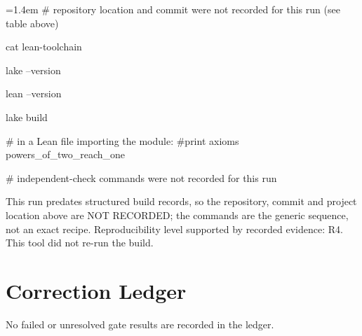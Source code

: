 \documentclass[11pt]{article}
\begin{document}
{\footnotesize\ttfamily\raggedright\hangindent=1.4em\noindent
\hspace*{0.00em}\# repository location and commit were not recorded for this run (see table above)\par
\hspace*{0.00em}cat lean-toolchain\par
\hspace*{0.00em}lake --version\par
\hspace*{0.00em}lean --version\par
\hspace*{0.00em}lake build\par
\hspace*{0.00em}\# in a Lean file importing the module:  \#print axioms powers\_\allowbreak{}of\_\allowbreak{}two\_\allowbreak{}reach\_\allowbreak{}one\par
\hspace*{0.00em}\# independent-check commands were not recorded for this run\par
}

This run predates structured build records, so the repository, commit and project location above are NOT RECORDED; the commands are the generic sequence, not an exact recipe.
Reproducibility level supported by recorded evidence: R4. This tool did not re-run the build.
\section{Correction Ledger}
No failed or unresolved gate results are recorded in the ledger.
\end{document}
